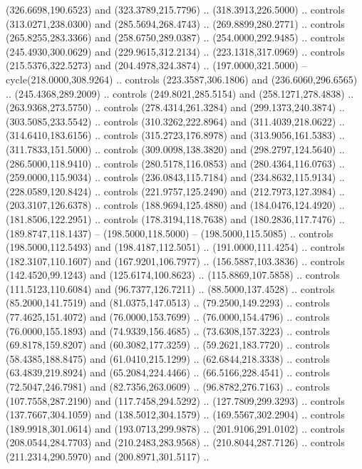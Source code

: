   (326.6698,190.6523) and (323.3789,215.7796) .. (318.3913,226.5000) .. controls
  (313.0271,238.0300) and (285.5694,268.4743) .. (269.8899,280.2771) .. controls
  (265.8255,283.3366) and (258.6750,289.0387) .. (254.0000,292.9485) .. controls
  (245.4930,300.0629) and (229.9615,312.2134) .. (223.1318,317.0969) .. controls
  (215.5376,322.5273) and (204.4978,324.3874) .. (197.0000,321.5000) --
  cycle(218.0000,308.9264) .. controls (223.3587,306.1806) and
  (236.6060,296.6565) .. (245.4368,289.2009) .. controls (249.8021,285.5154) and
  (258.1271,278.4838) .. (263.9368,273.5750) .. controls (278.4314,261.3284) and
  (299.1373,240.3874) .. (303.5085,233.5542) .. controls (310.3262,222.8964) and
  (311.4039,218.0622) .. (314.6410,183.6156) .. controls (315.2723,176.8978) and
  (313.9056,161.5383) .. (311.7833,151.5000) .. controls (309.0098,138.3820) and
  (298.2797,124.5640) .. (286.5000,118.9410) .. controls (280.5178,116.0853) and
  (280.4364,116.0763) .. (259.0000,115.9034) .. controls (236.0843,115.7184) and
  (234.8632,115.9134) .. (228.0589,120.8424) .. controls (221.9757,125.2490) and
  (212.7973,127.3984) .. (203.3107,126.6378) .. controls (188.9694,125.4880) and
  (184.0476,124.4920) .. (181.8506,122.2951) .. controls (178.3194,118.7638) and
  (180.2836,117.7476) .. (189.8747,118.1437) -- (198.5000,118.5000) --
  (198.5000,115.5085) .. controls (198.5000,112.5493) and (198.4187,112.5051) ..
  (191.0000,111.4254) .. controls (182.3107,110.1607) and (167.9201,106.7977) ..
  (156.5887,103.3836) .. controls (142.4520,99.1243) and (125.6174,100.8623) ..
  (115.8869,107.5858) .. controls (111.5123,110.6084) and (96.7377,126.7211) ..
  (88.5000,137.4528) .. controls (85.2000,141.7519) and (81.0375,147.0513) ..
  (79.2500,149.2293) .. controls (77.4625,151.4072) and (76.0000,153.7699) ..
  (76.0000,154.4796) .. controls (76.0000,155.1893) and (74.9339,156.4685) ..
  (73.6308,157.3223) .. controls (69.8178,159.8207) and (60.3082,177.3259) ..
  (59.2621,183.7720) .. controls (58.4385,188.8475) and (61.0410,215.1299) ..
  (62.6844,218.3338) .. controls (63.4839,219.8924) and (65.2084,224.4466) ..
  (66.5166,228.4541) .. controls (72.5047,246.7981) and (82.7356,263.0609) ..
  (96.8782,276.7163) .. controls (107.7558,287.2190) and (117.7458,294.5292) ..
  (127.7809,299.3293) .. controls (137.7667,304.1059) and (138.5012,304.1579) ..
  (169.5567,302.2904) .. controls (189.9918,301.0614) and (193.0713,299.9878) ..
  (201.9106,291.0102) .. controls (208.0544,284.7703) and (210.2483,283.9568) ..
  (210.8044,287.7126) .. controls (211.2314,290.5970) and (200.8971,301.5117) ..
